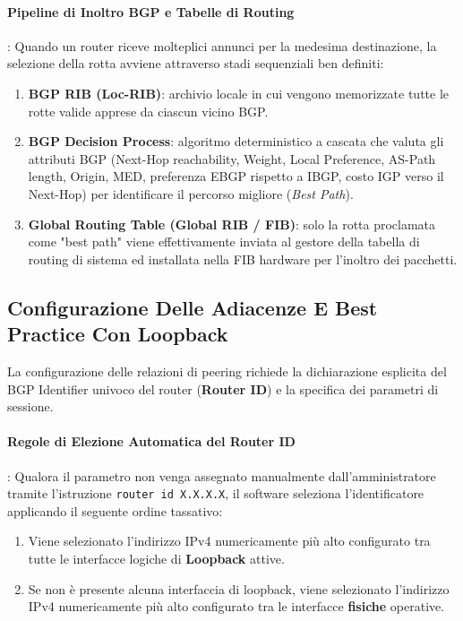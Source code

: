 \documentclass[11pt, a4paper]{article}
\begin{document}
\paragraph{Pipeline di Inoltro BGP e Tabelle di Routing}:
Quando un router riceve molteplici annunci per la medesima destinazione, la selezione della rotta avviene attraverso stadi sequenziali ben definiti:
\begin{enumerate}[noitemsep]
    \item \textbf{BGP RIB (Loc-RIB)}: archivio locale in cui vengono memorizzate tutte le rotte valide apprese da ciascun vicino BGP.
    \item \textbf{BGP Decision Process}: algoritmo deterministico a cascata che valuta gli attributi BGP (Next-Hop reachability, Weight, Local Preference, AS-Path length, Origin, MED, preferenza EBGP rispetto a IBGP, costo IGP verso il Next-Hop) per identificare il percorso migliore (\emph{Best Path}).
    \item \textbf{Global Routing Table (Global RIB / FIB)}: solo la rotta proclamata come "best path" viene effettivamente inviata al gestore della tabella di routing di sistema ed installata nella FIB hardware per l'inoltro dei pacchetti.
\end{enumerate}

\subsection{Configurazione Delle Adiacenze E Best Practice Con Loopback}

La configurazione delle relazioni di peering richiede la dichiarazione esplicita del BGP Identifier univoco del router (\textbf{Router ID}) e la specifica dei parametri di sessione.

\paragraph{Regole di Elezione Automatica del Router ID}:
Qualora il parametro non venga assegnato manualmente dall'amministratore tramite l'istruzione \texttt{router id X.X.X.X}, il software seleziona l'identificatore applicando il seguente ordine tassativo:
\begin{enumerate}[noitemsep]
    \item Viene selezionato l'indirizzo IPv4 numericamente più alto configurato tra tutte le interfacce logiche di \textbf{Loopback} attive.
    \item Se non è presente alcuna interfaccia di loopback, viene selezionato l'indirizzo IPv4 numericamente più alto configurato tra le interfacce \textbf{fisiche} operative.
\end{enumerate}
\end{document}

